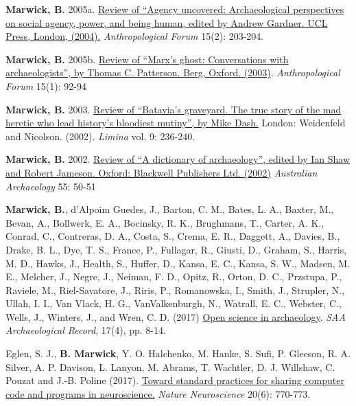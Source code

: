 \documentclass[11pt,article,oneside]{memoir}
\begin{document}
{{{{\ind \textbf{Marwick, B.} 2005a. \href{http://faculty.washington.edu/bmarwick/PDFs/Uncovered.pdf}{Review of “Agency uncovered: Archaeological perspectives on social agency, power, and being human, edited by Andrew Gardner. UCL Press, London, (2004).} \textit{Anthropological Forum} 15(2): 203-204.

\ind \textbf{Marwick, B.} 2005b. \href{http://faculty.washington.edu/bmarwick/PDFs/Ghosts.pdf}{Review of “Marx’s ghost: Conversations with archaeologists”, by Thomas C. Patterson. Berg, Oxford. (2003)}. \textit{Anthropological Forum} 15(1): 92-94

\ind \textbf{Marwick, B.} 2003. \href{http://faculty.washington.edu/bmarwick/PDFs/Batavia.pdf}{Review of “Batavia’s graveyard. The true story of the mad heretic who lead history’s bloodiest mutiny”, by Mike Dash.} London: Weidenfeld and Nicolson. (2002). \textit{Limina} vol. 9: 236-240.

\ind \textbf{Marwick, B.} 2002. \href{http://faculty.washington.edu/bmarwick/PDFs/Marwick_2002_Dictionary.pdf}{Review of “A dictionary of archaeology”, edited by Ian Shaw and Robert Jameson. Oxford: Blackwell Publishers Ltd. (2002)} \textit{Australian Archaeology} 55: 50-51

\bigskip

\newpage


\ind \textbf{Marwick, B.}, d’Alpoim Guedes, J., Barton, C. M., Bates, L. A., Baxter, M., Bevan, A., Bollwerk, E. A., Bocinsky, R. K., Brughmans, T., Carter, A. K., Conrad, C., Contreras, D. A., Costa, S., Crema, E. R., Daggett, A., Davies, B., Drake, B. L., Dye, T. S., France, P., Fullagar, R., Giusti, D., Graham, S., Harris, M. D., Hawks, J., Health, S., Huffer, D., Kansa, E. C., Kansa, S. W., Madsen, M. E., Melcher, J., Negre, J., Neiman, F. D., Opitz, R., Orton, D. C., Przstupa, P., Raviele, M., Riel-Savatore, J., Riris, P., Romanowska, I., Smith, J., Strupler, N., Ullah, I. I., Van Vlack, H. G., VanValkenburgh, N., Watrall, E. C., Webster, C., Wells, J., Winters, J., and Wren, C. D. (2017) \href{http://www.saa.org/Portals/0/SAA\_Record\_Sept\_2017\_Final\_LR.pdf\#page\=10}{Open science in archaeology}. \textit{SAA Archaeological Record}, 17(4), pp. 8-14. 

\ind Eglen, S. J., \textbf{B. Marwick}, Y. O. Halchenko, M. Hanke, S. Sufi, P. Gleeson, R. A. Silver, A. P. Davison, L. Lanyon, M. Abrams, T. Wachtler, D. J. Willshaw, C. Pouzat and J.-B. Poline (2017). \href{http://www.nature.com/neuro/journal/v20/n6/full/nn.4550.html}{Toward standard practices for sharing computer code and programs in neuroscience.} \textit{Nature Neuroscience} 20(6): 770-773.

}}}}
\end{document}
